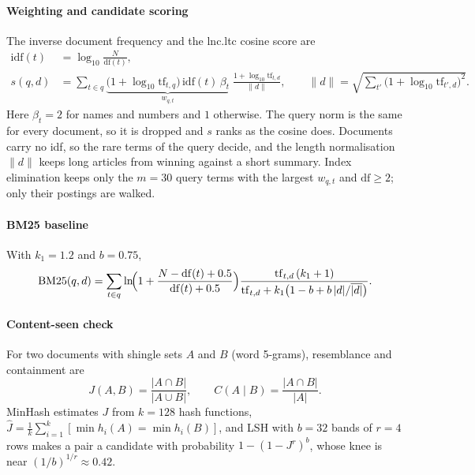 \documentclass[11pt,a4paper]{article}
\begin{document}
\paragraph{Weighting and candidate scoring} The inverse document frequency and the lnc.ltc cosine score are
\begin{align}
\mathrm{idf}(t) &= \log_{10}\frac{N}{\mathrm{df}(t)}, \label{eq:idf}\\
s(q,d) &= \sum_{t\in q}\underbrace{\bigl(1+\log_{10}\mathrm{tf}_{t,q}\bigr)\,\mathrm{idf}(t)\,\beta_t}_{w_{q,t}}\;\frac{1+\log_{10}\mathrm{tf}_{t,d}}{\lVert d\rVert},\qquad
\lVert d\rVert=\sqrt{\textstyle\sum_{t'}\bigl(1+\log_{10}\mathrm{tf}_{t',d}\bigr)^2}. \label{eq:cos}
\end{align}
Here $\beta_t=2$ for names and numbers and $1$ otherwise. The query norm is the same for every document, so it is dropped and $s$ ranks as the cosine does. Documents carry no idf, so the rare terms of the query decide, and the length normalisation $\lVert d\rVert$ keeps long articles from winning against a short summary. Index elimination keeps only the $m=30$ query terms with the largest $w_{q,t}$ and $\mathrm{df}\ge 2$; only their postings are walked.

\paragraph{BM25 baseline} With $k_1=1.2$ and $b=0.75$,
\begin{equation}
\mathrm{BM25}(q,d)=\sum_{t\in q}\ln\!\Bigl(1+\frac{N-\mathrm{df}(t)+0.5}{\mathrm{df}(t)+0.5}\Bigr)\frac{\mathrm{tf}_{t,d}\,(k_1+1)}{\mathrm{tf}_{t,d}+k_1\bigl(1-b+b\,|d|/\overline{|d|}\bigr)}. \label{eq:bm25}
\end{equation}

\paragraph{Content-seen check} For two documents with shingle sets $A$ and $B$ (word 5-grams), resemblance and containment are
\begin{equation}
J(A,B)=\frac{|A\cap B|}{|A\cup B|},\qquad C(A\mid B)=\frac{|A\cap B|}{|A|}. \label{eq:jacc}
\end{equation}
MinHash estimates $J$ from $k=128$ hash functions, $\hat J=\frac1k\sum_{i=1}^{k}[\min h_i(A)=\min h_i(B)]$, and LSH with $b=32$ bands of $r=4$ rows makes a pair a candidate with probability $1-(1-J^{r})^{b}$, whose knee is near $(1/b)^{1/r}\approx 0.42$.
\end{document}
